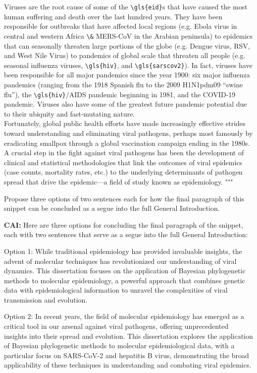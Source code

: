     Viruses are the root cause of some of the \verb|\gls{eid}|s that have caused the most human suffering and death over the last hundred years.
    They have been responsible for outbreaks that have affected local regions (e.g. Ebola virus in central and western Africa \verb|\&| MERS-CoV in the Arabian peninsula) to epidemics that can seasonally threaten large portions of the globe (e.g. Dengue virus, RSV, and West Nile Virus) to pandemics of global scale that threaten all people (e.g. seasonal influenza viruses, \verb|\gls{hiv}|, and \verb|\gls{sarscov2}|).
    In fact, viruses have been responsible for all major pandemics since the year 1900: six major influenza pandemics (ranging from the 1918 Spanish flu to the 2009 H1N1pdm09 ``swine flu''), the \verb|\gls{hiv}|/AIDS pandemic beginning in 1981, and the COVID-19 pandemic.
    Viruses also have some of the greatest future pandemic potential due to their ubiquity and fast-mutating nature.\\
    
    Fortunately, global public health efforts have made increasingly effective strides toward understanding and eliminating viral pathogens, perhaps most famously by eradicating smallpox through a global vaccination campaign ending in the 1980s.
    A crucial step in the fight against viral pathogens has been the development of clinical and statistical methodologies that link the outcomes of viral epidemics (case counts, mortality rates, etc.) to the underlying determinants of pathogen spread that drive the epidemic---a field of study known as epidemiology.
    """
    
    Propose three options of two sentences each for how the final paragraph of this snippet can be concluded as a segue into the full General Introduction.

\textbf{CAI:} Here are three options for concluding the final paragraph of the snippet, each with two sentences that serve as a segue into the full General Introduction:

    Option 1:
    While traditional epidemiology has provided invaluable insights, the advent of molecular techniques has revolutionized our understanding of viral dynamics. This dissertation focuses on the application of Bayesian phylogenetic methods to molecular epidemiology, a powerful approach that combines genetic data with epidemiological information to unravel the complexities of viral transmission and evolution.
    
    Option 2:
    In recent years, the field of molecular epidemiology has emerged as a critical tool in our arsenal against viral pathogens, offering unprecedented insights into their spread and evolution. This dissertation explores the application of Bayesian phylogenetic methods to molecular epidemiological data, with a particular focus on SARS-CoV-2 and hepatitis B virus, demonstrating the broad applicability of these techniques in understanding and combating viral epidemics.
    
